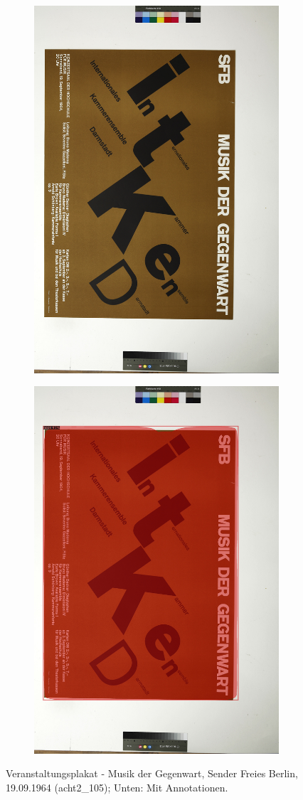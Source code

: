 \documentclass[a4paper,12pt,ngerman]{article}
\begin{document}
\newpage
\begin{figure}[ht]
	\begin{subfigure}[b]{\linewidth}
	\centering
	\includegraphics[height=\linewidth, angle=90]{Abbildung_23_(acht2_105)}
	\end{subfigure}
	\begin{subfigure}[b]{\linewidth}
	\centering
	\includegraphics[height=\linewidth, angle=90]{Abbildung_23_(acht2_105)_with_detections}
	\end{subfigure}
	\caption{Veranstaltungsplakat - Musik der Gegenwart, Sender Freies Berlin, 19.09.1964 (acht2\_105); Unten: Mit Annotationen.}
\end{figure}
\end{document}
